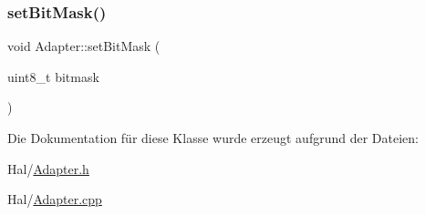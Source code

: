 \hypertarget{class_adapter_adff950a92be7f52dbe08ff3af766a562}{}\label{class_adapter_adff950a92be7f52dbe08ff3af766a562} 
\subsubsection{\texorpdfstring{set\+Bit\+Mask()}{setBitMask()}}
{\footnotesize\ttfamily void Adapter\+::set\+Bit\+Mask (\begin{DoxyParamCaption}\item[{uint8\+\_\+t}]{bitmask }\end{DoxyParamCaption})}



Die Dokumentation für diese Klasse wurde erzeugt aufgrund der Dateien\+:\begin{DoxyCompactItemize}
\item 
Hal/\hyperlink{_adapter_8h}{Adapter.\+h}\item 
Hal/\hyperlink{_adapter_8cpp}{Adapter.\+cpp}\end{DoxyCompactItemize}
